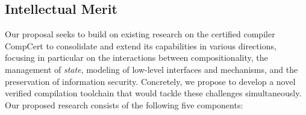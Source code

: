 \subsection{Intellectual Merit}
\label{ssec:intro-itm}

Our proposal seeks to build on existing research
on the certified compiler CompCert
to consolidate and extend its capabilities in various directions,
focusing in particular on the interactions between
compositionality,
the management of \emph{state},
modeling of low-level interfaces and mechanisms, and
the preservation of information security.
%
%
Concretely,
we propose to develop a novel verified compilation
toolchain that would tackle these challenges simultaneously. Our
proposed research consists of the following five components:
